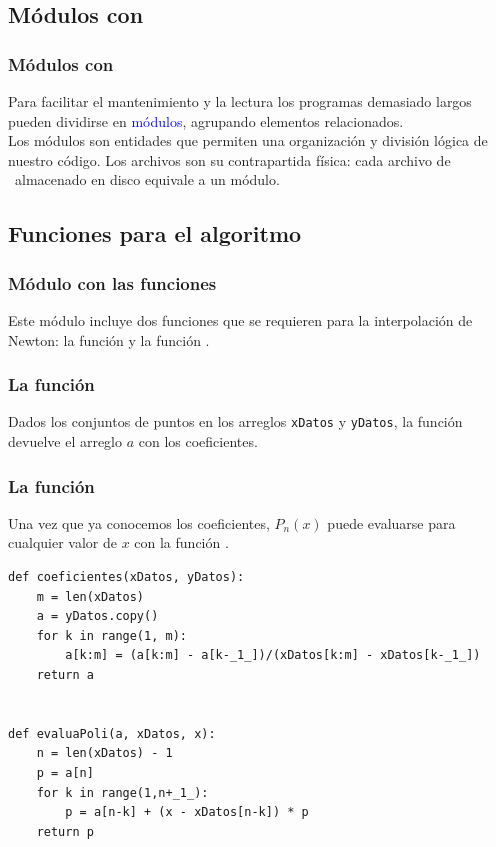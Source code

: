 \subsection{Módulos con \python}
\begin{frame}
\frametitle{Módulos con \python}
Para facilitar el mantenimiento y la lectura los programas demasiado largos pueden dividirse en \textcolor{blue}{módulos}, agrupando elementos relacionados.
\\
\bigskip
Los módulos son entidades que permiten una organización y división lógica de nuestro código. Los archivos son su contrapartida física: cada archivo de \python\ almacenado en disco equivale a un módulo.
\end{frame}
\begin{frame}
\subsection{Funciones para el algoritmo}
\frametitle{Módulo con las funciones}
Este módulo incluye dos funciones que se requieren para la interpolación de Newton: la función  y la función .
\end{frame}
\begin{frame}
\frametitle{La función }
Dados los conjuntos de puntos en los arreglos \texttt{xDatos} y \texttt{yDatos}, la función  devuelve el arreglo $a$ con los coeficientes.
\end{frame}
\begin{frame}
\frametitle{La función }
Una vez que ya conocemos los coeficientes, $P_{n}(x)$ puede evaluarse para cualquier valor de $x$ con la función .
\end{frame}
\begin{frame}
\begin{lstlisting}[caption=Funciones en el módulo \texttt{evalPoli},style= FormattedNumber, basicstyle=\linespread{1.1}\ttfamily=\small, columns=fullflexible]    
def coeficientes(xDatos, yDatos):
    m = len(xDatos) 
    a = yDatos.copy()
    for k in range(1, m):
        a[k:m] = (a[k:m] - a[k-_1_])/(xDatos[k:m] - xDatos[k-_1_])
    return a


def evaluaPoli(a, xDatos, x):
    n = len(xDatos) - 1 
    p = a[n]
    for k in range(1,n+_1_):
        p = a[n-k] + (x - xDatos[n-k]) * p
    return p
\end{lstlisting}
\end{frame}
